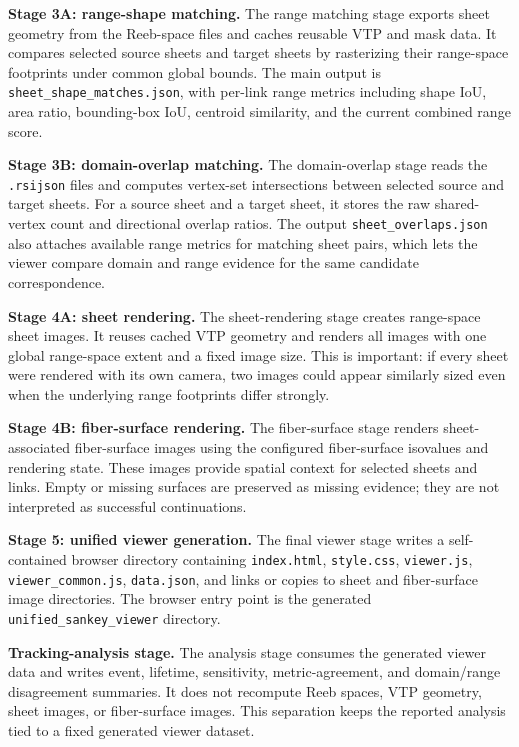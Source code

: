 \documentclass{vgtc}
\newcommand{\myparagraph}[1]{\vspace{1mm} \noindent \textbf{#1}}
\begin{document}
\myparagraph{Stage 3A: range-shape matching.}
The range matching stage exports sheet geometry from the Reeb-space files and caches reusable VTP and mask data. It compares selected source sheets and target sheets by rasterizing their range-space footprints under common global bounds. The main output is \texttt{sheet\_shape\_matches.json}, with per-link range metrics including shape IoU, area ratio, bounding-box IoU, centroid similarity, and the current combined range score.

\myparagraph{Stage 3B: domain-overlap matching.}
The domain-overlap stage reads the \texttt{.rsijson} files and computes vertex-set intersections between selected source and target sheets. For a source sheet and a target sheet, it stores the raw shared-vertex count and directional overlap ratios. The output \texttt{sheet\_overlaps.json} also attaches available range metrics for matching sheet pairs, which lets the viewer compare domain and range evidence for the same candidate correspondence.

\myparagraph{Stage 4A: sheet rendering.}
The sheet-rendering stage creates range-space sheet images. It reuses cached VTP geometry and renders all images with one global range-space extent and a fixed image size. This is important: if every sheet were rendered with its own camera, two images could appear similarly sized even when the underlying range footprints differ strongly.

\myparagraph{Stage 4B: fiber-surface rendering.}
The fiber-surface stage renders sheet-associated fiber-surface images using the configured fiber-surface isovalues and rendering state. These images provide spatial context for selected sheets and links. Empty or missing surfaces are preserved as missing evidence; they are not interpreted as successful continuations.

\myparagraph{Stage 5: unified viewer generation.}
The final viewer stage writes a self-contained browser directory containing \texttt{index.html}, \texttt{style.css}, \texttt{viewer.js}, \texttt{viewer\_common.js}, \texttt{data.json}, and links or copies to sheet and fiber-surface image directories. The browser entry point is the generated \texttt{unified\_sankey\_viewer} directory.

\myparagraph{Tracking-analysis stage.}
The analysis stage consumes the generated viewer data and writes event, lifetime, sensitivity, metric-agreement, and domain/range disagreement summaries. It does not recompute Reeb spaces, VTP geometry, sheet images, or fiber-surface images. This separation keeps the reported analysis tied to a fixed generated viewer dataset.
\end{document}
